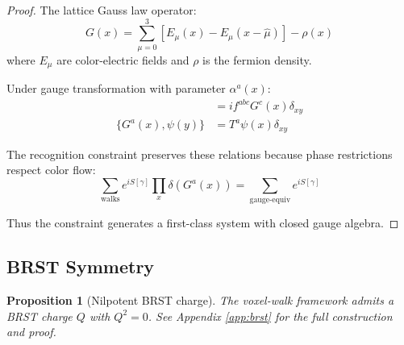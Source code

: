 \documentclass[11pt,a4paper]{article}
\newtheorem{proposition}[theorem]{Proposition}
\theoremstyle{definition}
\theoremstyle{remark}
\begin{document}
\begin{proof}
The lattice Gauss law operator:
\[
G(x) = \sum_{\mu=0}^3 \left[E_\mu(x) - E_\mu(x-\hat{\mu})\right] - \rho(x)
\]
where $E_\mu$ are color-electric fields and $\rho$ is the fermion density.

Under gauge transformation with parameter $\alpha^a(x)$:
\begin{align}
[G^a(x), G^b(y)] &= if^{abc}G^c(x)\delta_{xy}\\
\{G^a(x), \psi(y)\} &= T^a\psi(x)\delta_{xy}
\end{align}

The recognition constraint preserves these relations because phase restrictions respect color flow:
\[
\sum_{\text{walks}} e^{iS[\gamma]} \prod_x \delta(G^a(x)) = \sum_{\text{gauge-equiv}} e^{iS[\gamma]}
\]

Thus the constraint generates a first-class system with closed gauge algebra.
\end{proof}

\subsection{BRST Symmetry}

\begin{proposition}[Nilpotent BRST charge]
The voxel-walk framework admits a BRST charge $Q$ with $Q^2 = 0$. See Appendix \ref{app:brst} for the full construction and proof.
\end{proposition}
\end{document}
